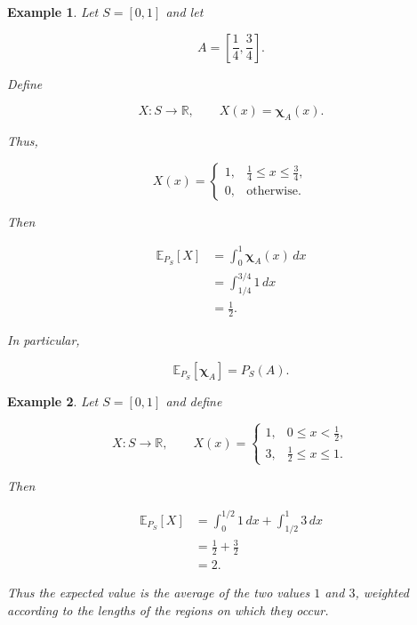 \documentclass[10pt,a4paper]{book}
\newtheorem{example}{Example}[section]
\begin{document}
\begin{example}

    Let $S=[0,1]$ and let

    $$
        A=\left[\frac14,\frac34\right].
    $$

    Define

    $$
        X:S\to\mathbb R,
        \qquad
        X(x)=\mathbf \chi_A(x).
    $$

    Thus,

    $$
        X(x)=
        \begin{cases}
            1, & \frac14\leq x\leq\frac34, \\
            0, & \text{otherwise}.
        \end{cases}
    $$

    Then

    $$
        \begin{aligned}
            \mathbb E_{P_S}[X]
             & =
            \int_0^1\mathbf \chi_A(x)\,dx \\
             & =
            \int_{1/4}^{3/4}1\,dx         \\
             & =
            \frac12.
        \end{aligned}
    $$

    In particular,

    $$
        \mathbb E_{P_S}[\mathbf \chi_A]
        =
        P_S(A).
    $$

\end{example}

\begin{example}

    Let $S=[0,1]$ and define

    $$
        X:S\to\mathbb R,
        \qquad
        X(x)=
        \begin{cases}
            1, & 0\leq x<\frac12,    \\
            3, & \frac12\leq x\leq1.
        \end{cases}
    $$

    Then

    $$
        \begin{aligned}
            \mathbb E_{P_S}[X]
             & =
            \int_0^{1/2}1\,dx
            +
            \int_{1/2}^1 3\,dx \\
             & =
            \frac12+\frac32    \\
             & =
            2.
        \end{aligned}
    $$

    Thus the expected value is the average of the two values $1$ and $3$, weighted according to the lengths of the regions on which they occur.

\end{example}
\end{document}
